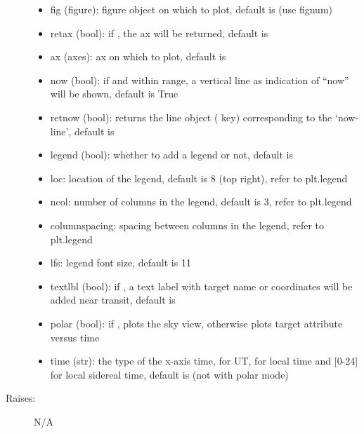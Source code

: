 \documentclass[letterpaper,10pt,english]{sphinxmanual}
\begin{document}
\begin{fulllineitems}
\begin{fulllineitems}
\begin{description}
\begin{itemize}
\item {} 
fig (figure): figure object on which to plot, default is  (use fignum)

\item {} 
retax (bool): if , the ax will be returned, default is 

\item {} 
ax (axes): ax on which to plot, default is 

\item {} 
now (bool): if  and within range, a vertical line as indication of ``now'' will be shown, default is True

\item {} 
retnow (bool): returns the line object ( key) corresponding to the `now-line', default is 

\item {} 
legend (bool): whether to add a legend or not, default is 

\item {} 
loc: location of the legend, default is 8 (top right), refer to plt.legend

\item {} 
ncol: number of columns in the legend, default is 3, refer to plt.legend

\item {} 
columnspacing: spacing between columns in the legend, refer to plt.legend

\item {} 
lfs: legend font size, default is 11

\item {} 
textlbl (bool): if , a text label with target name or coordinates will be added near transit, default is 

\item {} 
polar (bool): if , plots the sky view, otherwise plots target attribute versus time

\item {} 
time (str): the type of the x-axis time,  for UT,  for local time and  {[}0-24{]} for local sidereal time, default is  (not with polar mode)

\end{itemize}

\item[{Raises:}] \leavevmode
N/A

\end{description}


\end{fulllineitems}
\end{fulllineitems}
\end{document}
